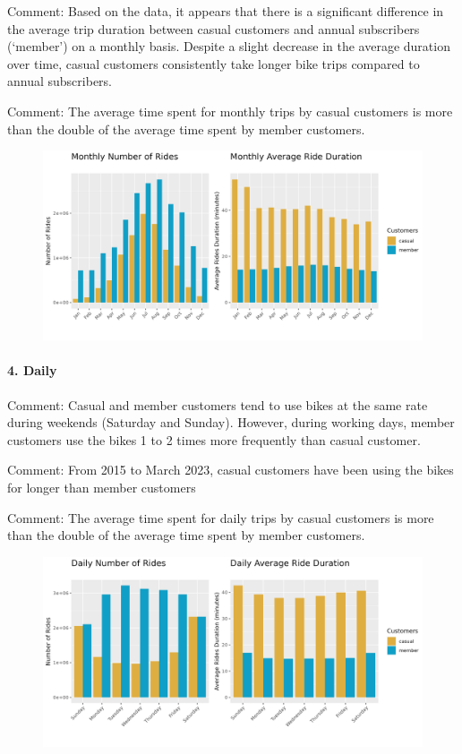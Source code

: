 \documentclass[
]{article}
\begin{document}
Comment: Based on the data, it appears that there is a significant
difference in the average trip duration between casual customers and
annual subscribers (`member') on a monthly basis. Despite a slight
decrease in the average duration over time, casual customers
consistently take longer bike trips compared to annual subscribers.

Comment: The average time spent for monthly trips by casual customers is
more than the double of the average time spent by member customers.

\begin{figure}
\includegraphics[width=1\linewidth]{outputs/img/bar_plots__average_number_of_rides_and_duration_per_customer_by_month} \end{figure}

\hypertarget{daily}{%
\paragraph{4. Daily}\label{daily}}

Comment: Casual and member customers tend to use bikes at the same rate
during weekends (Saturday and Sunday). However, during working days,
member customers use the bikes 1 to 2 times more frequently than casual
customer.

Comment: From 2015 to March 2023, casual customers have been using the
bikes for longer than member customers

Comment: The average time spent for daily trips by casual customers is
more than the double of the average time spent by member customers.

\begin{figure}
\includegraphics[width=1\linewidth]{outputs/img/bar_plots__average_number_of_rides_and_duration_per_customer_by_day} \end{figure}
\end{document}
